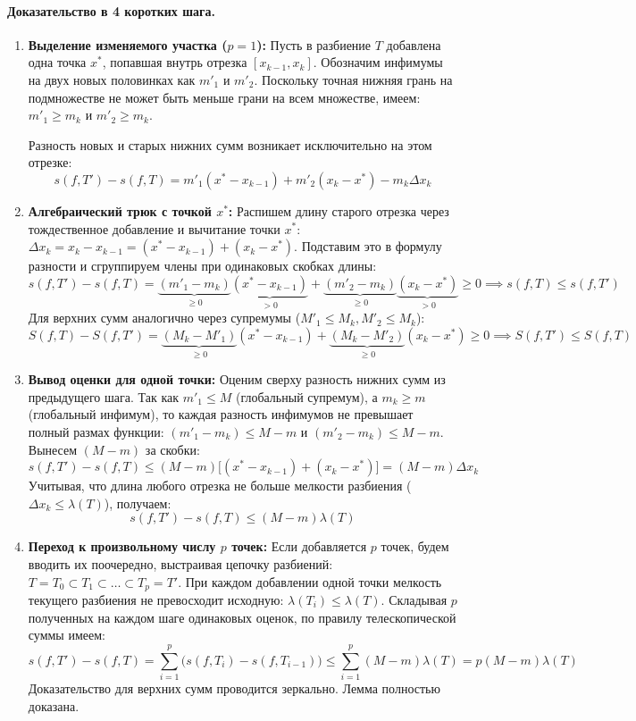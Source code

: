 \paragraph{Доказательство в 4 коротких шага.}

\begin{enumerate}
    \item \textbf{Выделение изменяемого участка ($p=1$):}
    Пусть в разбиение $T$ добавлена одна точка $x^*$, попавшая внутрь отрезка $[x_{k-1}, x_k]$. Обозначим инфимумы на двух новых половинках как $m'_1$ и $m'_2$. Поскольку точная нижняя грань на подмножестве не может быть меньше грани на всем множестве, имеем: $m'_1 \ge m_k$ и $m'_2 \ge m_k$.
    
    Разность новых и старых нижних сумм возникает исключительно на этом отрезке:
    $$ s(f, T') - s(f, T) = m'_1 (x^* - x_{k-1}) + m'_2 (x_k - x^*) - m_k \Delta x_k $$

    \item \textbf{Алгебраический трюк с точкой $x^*$:}
    Распишем длину старого отрезка через тождественное добавление и вычитание точки $x^*$: $\Delta x_k = x_k - x_{k-1} = (x^* - x_{k-1}) + (x_k - x^*)$. Подставим это в формулу разности и сгруппируем члены при одинаковых скобках длины:
    $$ s(f, T') - s(f, T) = \underbrace{(m'_1 - m_k)}_{\ge 0} \underbrace{(x^* - x_{k-1})}_{> 0} + \underbrace{(m'_2 - m_k)}_{\ge 0} \underbrace{(x_k - x^*)}_{> 0} \ge 0 \implies s(f, T) \le s(f, T') $$
    Для верхних сумм аналогично через супремумы ($M'_1 \le M_k, M'_2 \le M_k$):
    $$ S(f, T) - S(f, T') = \underbrace{(M_k - M'_1)}_{\ge 0} (x^* - x_{k-1}) + \underbrace{(M_k - M'_2)}_{\ge 0} (x_k - x^*) \ge 0 \implies S(f, T') \le S(f, T) $$

    \item \textbf{Вывод оценки для одной точки:}
    Оценим сверху разность нижних сумм из предыдущего шага. Так как $m'_1 \le M$ (глобальный супремум), а $m_k \ge m$ (глобальный инфимум), то каждая разность инфимумов не превышает полный размах функции: $(m'_1 - m_k) \le M - m$ и $(m'_2 - m_k) \le M - m$. Вынесем $(M-m)$ за скобки:
    $$ s(f, T') - s(f, T) \le (M - m) \big[ (x^* - x_{k-1}) + (x_k - x^*) \big] = (M - m)\Delta x_k $$
    Учитывая, что длина любого отрезка не больше мелкости разбиения ($\Delta x_k \le \lambda(T)$), получаем:
    $$ s(f, T') - s(f, T) \le (M - m)\lambda(T) $$

    \item \textbf{Переход к произвольному числу $p$ точек:}
    Если добавляется $p$ точек, будем вводить их поочередно, выстраивая цепочку разбиений: $T = T_0 \subset T_1 \subset \dots \subset T_p = T'$. При каждом добавлении одной точки мелкость текущего разбиения не превосходит исходную: $\lambda(T_i) \le \lambda(T)$.
    Складывая $p$ полученных на каждом шаге одинаковых оценок, по правилу телескопической суммы имеем:
    $$ s(f, T') - s(f, T) = \sum_{i=1}^p \big(s(f, T_i) - s(f, T_{i-1})\big) \le \sum_{i=1}^p (M - m)\lambda(T) = p(M - m)\lambda(T) $$
    Доказательство для верхних сумм проводится зеркально. Лемма полностью доказана.
\end{enumerate}

